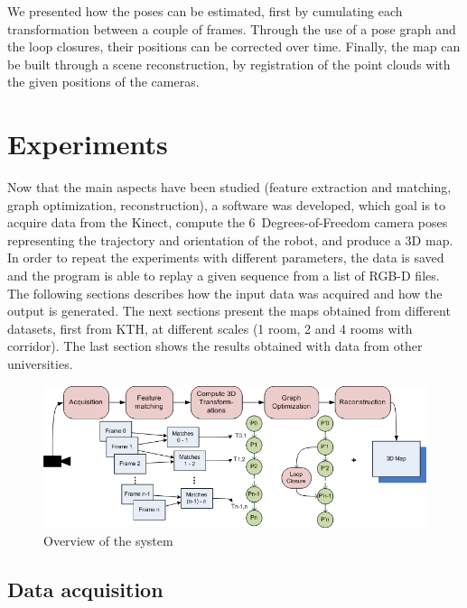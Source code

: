 We presented how the poses can be estimated, first by cumulating each transformation between a couple of frames. Through the use of a pose graph and the loop closures, their positions can be corrected over time. Finally, the map can be built through a scene reconstruction, by registration of the point clouds with the given positions of the cameras.

\chapter{Experiments}
\label{chap:experiments}

Now that the main aspects have been studied (feature extraction and matching, graph optimization, reconstruction), a software was developed, which goal is to acquire data from the Kinect, compute the 6~Degrees-of-Freedom camera poses representing the trajectory and orientation of the robot, and produce a 3D map. In order to repeat the experiments with different parameters, the data is saved and the program is able to replay a given sequence from a list of RGB-D files. The following sections describes how the input data was acquired and how the output is generated. The next sections present the maps obtained from different datasets, first from KTH, at different scales (1 room, 2 and 4 rooms with corridor). The last section shows the results obtained with data from other universities. 

\begin{figure}[h!]
\begin{center}
\includegraphics[width=1.0\textwidth]{figures/overview}
\caption{Overview of the system}
\end{center}
\end{figure}

\clearpage

\section{Data acquisition}

